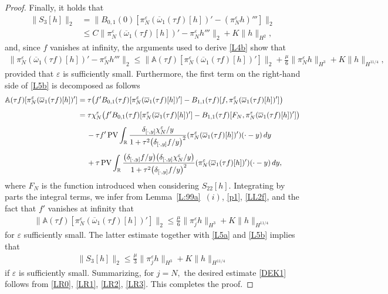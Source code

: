 \documentclass[11pt,reqno]{amsart}
\numberwithin{equation}{section}
\newcommand{\PV}{\mathop{\rm PV}\nolimits}
\newcommand{\0}{\Omega}
\newcommand{\e}{\varepsilon}
\newcommand{\ov}{\overline}
\newcommand{\oo}{\ov\omega}
\newcommand{\bA}{\mathbb{A}}
\newcommand{\R}{\mathbb{R}}
\numberwithin{equation}{section}
\begin{document}
\begin{proof}
Finally, it holds that
\begin{align}\label{L5a}
 \|S_3[h]\|_2&=\|B_{0,1}(0)[\pi^\e_N(\oo_1(\tau f)[h])' - (\pi^\e_N h)''']\|_2\nonumber\\[1ex]
 &\leq C\|\pi^\e_N(\oo_1(\tau f)[h])' - \pi^\e_N h'''\|_2+K\|h\|_{H^2},
\end{align}
 and, since $f$ vanishes at infinity,  the  arguments used to derive \eqref{L4b} show that
 \begin{align}\label{L5b}
\|\pi_N^\e(\oo_1(\tau f)[h])'-\pi^\e_N h'''\|_2\leq\|\bA(\tau f)[\pi_N^\e(\oo_1(\tau f)[h])']\|_2+\frac{\mu}{6}\|\pi^\e_N h \|_{H^3}+ K\|h\|_{H^{11/4}},
\end{align}
provided that $\e$ is sufficiently small.
Furthermore, the first term on the right-hand side of \eqref{L5b} is decomposed as follows
\begin{align*}
 \bA(\tau f)[\pi_N^\e(\oo_1(\tau f)[h])']&=\tau\big(f'B_{0,1}(\tau f)[\pi_N^\e(\oo_1(\tau f)[h])'] -B_{1,1}(\tau f)[f,\pi_N^\e(\oo_1(\tau f)[h])']\big)\\[1ex]
 &=\tau\chi_N^\e\big( f'B_{0,1}(\tau f)[\pi_N^\e(\oo_1(\tau f)[h])'] -B_{1,1}(\tau f)[F_N,\pi_N^\e(\oo_1(\tau f)[h])']\big)\\[1ex]
 &\hspace{0.424cm}-\tau f'\PV\int_\R\frac{\delta_{[\cdot,y]}\chi_N^\e/y}{1+\tau^2\big( \delta_{[\cdot,y]} f/y\big)^2} (\pi^\e_N(\oo_1(\tau f)[h])')(\cdot-y) \,dy\\[1ex]
 &\hspace{0.424cm}+\tau \PV\int_\R\frac{\big(\delta_{[\cdot,y]}f/y\big)\big(\delta_{[\cdot,y]}\chi_N^\e/y\big)}{1+\tau^2\big( \delta_{[\cdot,y]} f/y\big)^2} (\pi^\e_N(\oo_1(\tau f)[h])')(\cdot-y) \,dy,
\end{align*}
where $F_N$  is the function introduced when considering $S_{22}[h]$.
Integrating by parts the integral terms, we infer from Lemma~\ref{L:99a}~$(i)$, \eqref{p1}, \eqref{LL2f}, and  the fact that $f'$ vanishes at infinity that
\begin{align*} 
 \|\bA(\tau f)[\pi_N^\e(\oo_1(\tau f)[h])']\|_2 \leq \frac{\mu}{6}\|\pi^\e_j h \|_{H^3}+ K\|h\|_{H^{11/4}}
\end{align*}
for $\e$ sufficiently small. The latter estimate together with \eqref{L5a} and \eqref{L5b} implies that 
\begin{align}\label{LR3}
 \|S_3[h]\|_2\leq  \frac{\mu}{3}\|\pi^\e_j h \|_{H^3}+ K\|h\|_{H^{11/4}}
\end{align}
if $\e$ is sufficiently small. 
Summarizing, for $j=N,$ the desired estimate \eqref{DEK1} follows from \eqref{LR0}, \eqref{LR1}, \eqref{LR2}, \eqref{LR3}.
This completes the proof.
\end{proof}
\end{document}
